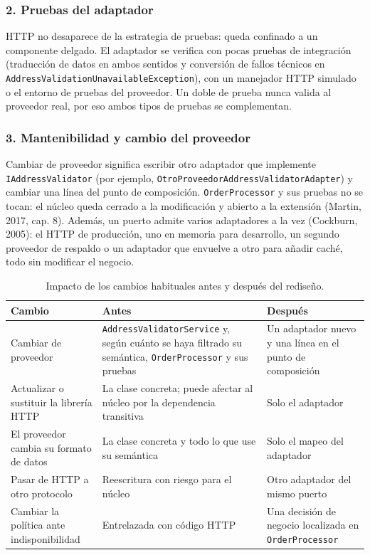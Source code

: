 \documentclass[11pt,a4paper]{article}
\begin{document}
\subsubsection*{2. Pruebas del adaptador}

HTTP no desaparece de la estrategia de pruebas: queda confinado a un componente delgado. El
adaptador se verifica con pocas pruebas de integración (traducción de datos en ambos sentidos
y conversión de fallos técnicos en \texttt{AddressValidationUnavailableException}), con un
manejador HTTP simulado o el entorno de pruebas del proveedor. Un doble de prueba nunca valida
al proveedor real, por eso ambos tipos de pruebas se complementan.

\subsubsection*{3. Mantenibilidad y cambio del proveedor}

Cambiar de proveedor significa escribir otro adaptador que implemente
\texttt{IAddressValidator} (por ejemplo, \texttt{OtroProveedorAddressValidatorAdapter}) y
cambiar una línea del punto de composición. \texttt{OrderProcessor} y sus pruebas no se tocan: el núcleo queda
cerrado a la modificación y abierto a la extensión (Martin, 2017, cap. 8). Además, un puerto
admite varios adaptadores a la vez (Cockburn, 2005): el HTTP de producción, uno en memoria
para desarrollo, un segundo proveedor de respaldo o un adaptador que envuelve a otro para
añadir caché, todo sin modificar el negocio.

\begin{table}[htbp]
\centering
\small
\renewcommand{\arraystretch}{1.25}
\begin{tabularx}{\linewidth}{@{}>{\raggedright\arraybackslash}p{3.6cm}LL@{}}
\toprule
\textbf{Cambio} & \textbf{Antes} & \textbf{Después} \\
\midrule
Cambiar de proveedor & \texttt{AddressValidatorService} y, según cuánto se haya filtrado su semántica, \texttt{OrderProcessor} y sus pruebas & Un adaptador nuevo y una línea en el punto de composición \\
\addlinespace
Actualizar o sustituir la librería HTTP & La clase concreta; puede afectar al núcleo por la dependencia transitiva & Solo el adaptador \\
\addlinespace
El proveedor cambia su formato de datos & La clase concreta y todo lo que use su semántica & Solo el mapeo del adaptador \\
\addlinespace
Pasar de HTTP a otro protocolo & Reescritura con riesgo para el núcleo & Otro adaptador del mismo puerto \\
\addlinespace
Cambiar la política ante indisponibilidad & Entrelazada con código HTTP & Una decisión de negocio localizada en \texttt{OrderProcessor} \\
\bottomrule
\end{tabularx}
\caption{Impacto de los cambios habituales antes y después del rediseño.}
\label{tab:cambios}
\end{table}
\end{document}
